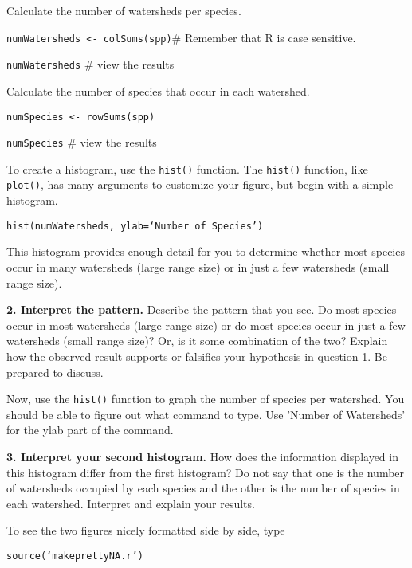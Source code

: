 \documentclass[11pt]{article}
\begin{document}
Calculate the number of watersheds per species.

\texttt{numWatersheds \textless{}- colSums(spp)}\qquad \# Remember that R is case
sensitive.

\texttt{numWatersheds} \qquad \# view the results

Calculate the number of species that occur in each watershed.

\texttt{numSpecies \textless{}- rowSums(spp)}

\texttt{numSpecies} \qquad \# view the results

To create a histogram, use the \texttt{hist()} function. The
\texttt{hist()} function, like \texttt{plot()}, has many arguments to
customize your figure, but begin with a simple histogram.

\texttt{hist(numWatersheds, ylab=‘Number of Species’)}

This histogram provides enough detail for you to determine whether most
species occur in many watersheds (large range size) or in just a few
watersheds (small range size).

\textbf{2. Interpret the pattern.} Describe the pattern that you see. Do most
species occur in most watersheds (large range size) or do most species
occur in just a few watersheds (small range size)? Or, is it some
combination of the two? Explain how the observed result supports or
falsifies your hypothesis in question 1. Be prepared to discuss.

\vspace{6\baselineskip}

Now, use the \texttt{hist()} function to graph the number of species per
watershed. You should be able to figure out what command to type. Use 'Number 
of Watersheds' for the ylab part of the command.

\textbf{3. Interpret your second histogram.} How does the information displayed
in this histogram differ from the first histogram? Do not say that
one is the number of watersheds occupied by each species and the other
is the number of species in each watershed. Interpret and explain your results.

\vspace{6\baselineskip}

To see the two figures nicely formatted side by side, type


\texttt{source(‘makeprettyNA.r’)}
\end{document}
